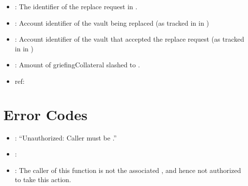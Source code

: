 \documentclass[a4paper,10pt,english]{sphinxmanual}
\begin{document}


\begin{itemize}
\item {} 
: The identifier of the replace request in .

\item {} 
: Account identifier of the vault being replaced (as tracked in  in {\hyperref[\detokenize{spec/vault-registry:vault-registry}]{}})

\item {} 
: Account identifier of the vault that accepted the replace request (as tracked in  in {\hyperref[\detokenize{spec/vault-registry:vault-registry}]{}})

\item {} 
: Amount of griefingCollateral slashed to .

\end{itemize}

\begin{itemize}
\item {} 
ref:

\end{itemize}


\section{Error Codes}
\label{\detokenize{spec/replace:error-codes}}
\begin{itemize}
\item {} 
: “Unauthorized: Caller must be .”

\item {} 
: {\hyperref[\detokenize{spec/replace:cancelreplace}]{}}

\item {} 
: The caller of this function is not the associated , and hence not authorized to take this action.

\end{itemize}
\end{document}
